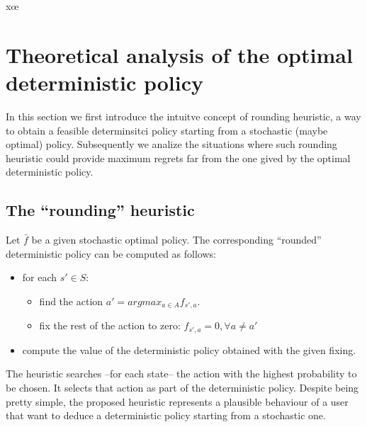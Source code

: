xœ
\section{Theoretical analysis of the optimal deterministic policy}\label{sec:comparison}

In this section we first introduce the intuitve concept of rounding heuristic, a way to obtain a feasible determinsitci policy starting from a stochastic (maybe optimal) policy. Subsequently we analize the situations where such rounding heuristic could provide maximum regrets far from the one gived by the optimal deterministic policy.

\subsection{The ``rounding'' heuristic}\label{sec:rounding}

Let $\bar{f}$ be a given stochastic optimal policy. The corresponding ``rounded'' deterministic policy can be computed as follows:
\begin{itemize}
\item for each $s'\in S$:
\begin{itemize}
\item find the action $a' = argmax_{a \in A}f_{s',a}$.
\item fix the rest of the action to zero: $f_{s',a} =0, \forall a \neq a'$
\end{itemize}
\item compute the value of the deterministic policy obtained with the given fixing.
\end{itemize}
 
The heuristic searches --for each state-- the action with the highest probability to be chosen. It selects that action as part of the deterministic policy.
Despite being pretty simple, the proposed heuristic represents a plausible behaviour of a user that want to deduce a deterministic policy starting from a stochastic one.  
%
%
%
%
%
